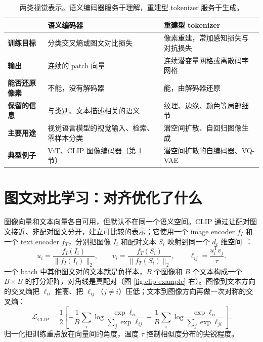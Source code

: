 \begin{table}[ht]
\centering\small
\begin{tabularx}{\textwidth}{>{\bfseries}p{24mm} X X}
\toprule
 & 语义编码器 & 重建型 tokenizer\\
\midrule
训练目标 & 分类交叉熵或图文对比损失 & 像素重建，常加感知损失与对抗损失\\
输出 & 连续的 patch 向量 & 连续潜变量网格或离散码字网格\\
能否还原像素 & 不能，没有解码器 & 能，由解码器还原\\
保留的信息 & 与类别、文本描述相关的语义 & 纹理、边缘、颜色等局部细节\\
主要用途 & 视觉语言模型的视觉输入、检索、零样本分类 & 潜空间扩散、自回归图像生成\\
典型例子 & ViT、CLIP 图像编码器（第 \ref{sec:clip} 节） &潜空间扩散的自编码器、VQ-VAE\\
\bottomrule
\end{tabularx}
\caption{两类视觉表示。语义编码器服务于理解，重建型 tokenizer 服务于生成。}
\label{tab:visual-tokenizers}
\end{table}

\section{图文对比学习：对齐优化了什么}
\label{sec:clip}

图像向量和文本向量各自可用，但默认不在同一个语义空间。CLIP 通过让配对图文接近、非配对图文分开，建立可比较的表示；它使用一个 image encoder \(f_I\) 和一个 text encoder \(f_T\)，分别把图像 \(I_i\) 和配对文本 \(S_i\) 映射到同一个 \(d_c\) 维空间~\cite{radford2021clip}：
\begin{equation}
 u_i=\frac{f_I(I_i)}{\|f_I(I_i)\|_2},\qquad
 v_i=\frac{f_T(S_i)}{\|f_T(S_i)\|_2},\qquad
 \ell_{ij}=\frac{u_i^\mathsf T v_j}{\tau}.
\end{equation}
一个 batch 中其他图文对的文本就是负样本，\(B\) 个图像和 \(B\) 个文本构成一个 \(B\times B\) 的打分矩阵，对角线是真配对（图 \ref{fig:clip-example} 右）。图像到文本方向的交叉熵把 \(\ell_{ii}\) 推高、把 \(\ell_{ij}\)（\(j\neq i\)）压低；文本到图像方向再做一次对称的交叉熵：
\begin{equation}
 \mathcal L_{\mathrm{CLIP}}
 =\frac12\left[
 -\frac1B\sum_i\log\frac{\exp\ell_{ii}}{\sum_j\exp\ell_{ij}}
 -\frac1B\sum_i\log\frac{\exp\ell_{ii}}{\sum_j\exp\ell_{ji}}
 \right].
 \label{eq:clip-loss}
\end{equation}
归一化把训练重点放在向量间的角度，温度 \(\tau\) 控制相似度分布的尖锐程度。

